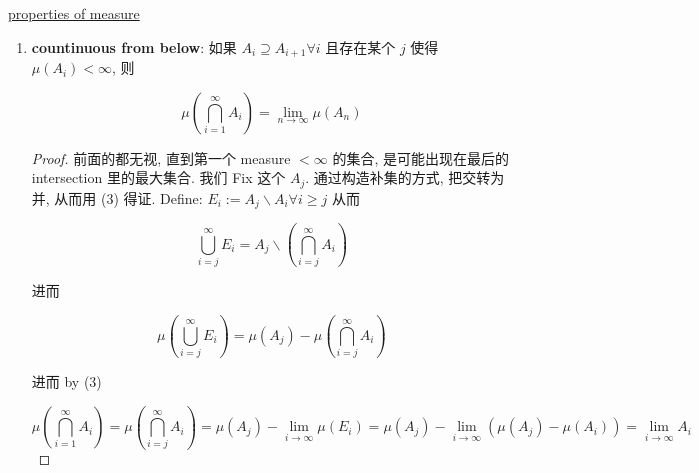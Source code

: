 \documentclass{qlnotes-export}
\begin{document}
\begin{theorem}{\href{https://qiulinfan.github.io/notes/math/measure-theory/\#kn-properties-of-measure}{properties
of measure}}
\begin{enumerate}
\begin{proof}
  \end{proof}
\item
  \textbf{countinuous from below}: 如果 \(A_{i} \supseteq A_{i + 1}\forall i\) 且存在某个 \(j\) 使得 \(\mu(A_{i}) < \infty\), 则

  \[\mu(\bigcap\limits_{i = 1}^{\infty}A_{i}) = \lim\limits_{n\rightarrow\infty}\mu(A_{n})\]

  \begin{proof}

  前面的都无视, 直到第一个 measure \(< \infty\) 的集合, 是可能出现在最后的 intersection 里的最大集合. 我们 Fix 这个 \(A_{j}\). 通过构造补集的方式, 把交转为并, 从而用 (3) 得证. Define: \(E_{i} := A_{j}\backslash A_{i}\forall i \geq j\) 从而

  \[\bigcup\limits_{i = j}^{\infty}E_{i} = A_{j}\backslash(\bigcap\limits_{i = j}^{\infty}A_{i})\]

  进而

  \[\mu(\bigcup\limits_{i = j}^{\infty}E_{i}) = \mu(A_{j}) - \mu(\bigcap\limits_{i = j}^{\infty}A_{i})\]

  进而 by (3)

  \[\mu(\bigcap\limits_{i = 1}^{\infty}A_{i}) = \mu(\bigcap\limits_{i = j}^{\infty}A_{i}) = \mu(A_{j}) - \lim\limits_{i\rightarrow\infty}\mu(E_{i}) = \mu(A_{j}) - \lim\limits_{i\rightarrow\infty}(\mu(A_{j}) - \mu(A_{i})) = \lim\limits_{i\rightarrow\infty}A_{i}\]

  \end{proof}
\end{enumerate}

\end{theorem}
\end{document}
